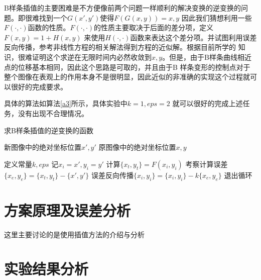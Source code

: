 \documentclass[UTF8,a4paper]{paper}
\begin{document}
B样条插值的主要困难是不方便像前两个问题一样顺利的解决变换的逆变换的问题。即很难找到一个$G(x',y')$使得$F(G(x,y)) = x,y$
因此我们猜想利用一些$F(\cdot,\cdot)$函数的性质。$F(\cdot,\cdot)$的性质主要取决于后面的差分项，定义$F(x,y) = 1 + H(x,y)$
来使用$H(\cdot,\cdot)$函数来表达这个差分项。并试图利用误差反向传播，参考非线性方程的相关解法得到方程的近似解。根据目前所学的
知识，很难证明这个求逆在无限时间内必然收敛到$x,y$。但是，由于B样条曲线相近点的位移基本相同，因此这个思路是可取的，并且由于B
样条变形的控制点对于整个图像在表观上的作用本身不是很明显，因此近似的非准确的实现这个过程就可以很好的完成要求。

具体的算法如算法\ref{a3}所示，具体实验中$k = 1,eps = 2$ 就可以很好的完成上述任务，没有出现不合理情况。
\begin{algorithm}[h]\caption{求B样条插值的逆变换的函数}\label{a3}\begin{algorithmic}
    \Require 新图像中的绝对坐标位置$x',y'$
    \Ensure 原图像中的绝对坐标位置$x,y$\end{algorithmic}\begin{algorithmic}[1]
    \State 定义常量$k,eps$
    \State 记$x_i = x',y_i = y'$
    \State 计算$\{x_t,y_t\} = F(x_i,y_i)$
    \State 考察计算误差$\{x_e,y_e\} = \{x_t,y_t\} - \{x',y'\}$
    \State 误差反向传播$\{x_i,y_i\} = \{x_i,y_i\} - k\{x_e,y_e\}$
        \State 退出循环
    \EndIf
    \EndFor
    \EndFunction
\end{algorithmic}\end{algorithm}
\section{方案原理及误差分析}
这里主要讨论的是使用插值方法的介绍与分析
\section{实验结果分析}
\end{document}

